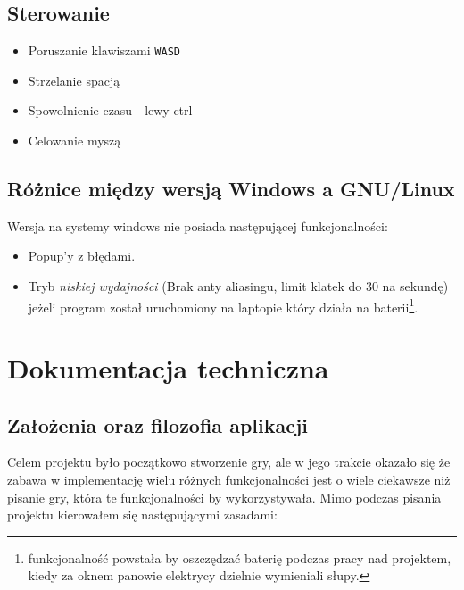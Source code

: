 \documentclass[a4paper,11pt]{article}
\begin{document}
\subsection*{Sterowanie}

\begin{itemize}
    \item Poruszanie klawiszami \texttt{WASD}
    \item Strzelanie spacją
    \item Spowolnienie czasu - lewy ctrl
    \item Celowanie myszą
\end{itemize}

\subsection*{Różnice między wersją Windows a GNU/Linux}

Wersja na systemy windows nie posiada następującej funkcjonalności:
\begin{itemize}
    \item Popup'y z błędami.
    \item Tryb \emph{niskiej wydajności} (Brak anty aliasingu, limit klatek do
        30 na sekundę) jeżeli program został uruchomiony na laptopie który
        działa na baterii\footnote{funkcjonalność powstała by oszczędzać baterię
        podczas pracy nad projektem, kiedy za oknem panowie elektrycy dzielnie
        wymieniali słupy.}.
\end{itemize}

\section{Dokumentacja techniczna}

\subsection{Założenia oraz filozofia aplikacji}

Celem projektu było początkowo stworzenie gry, ale w jego trakcie okazało się że zabawa w implementację wielu różnych funkcjonalności jest o wiele ciekawsze niż pisanie gry, która te funkcjonalności by wykorzystywała. Mimo podczas pisania projektu kierowałem się następującymi zasadami:
\end{document}
